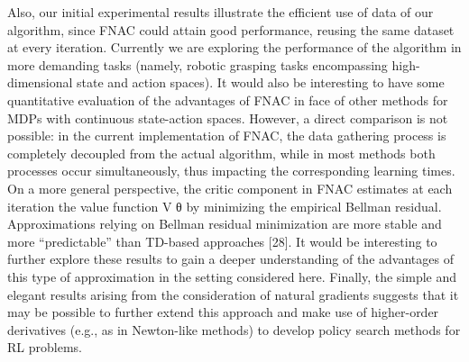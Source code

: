 \begin{itemize}
	Also, our initial experimental results illustrate the eﬃcient use of data of our algorithm, since FNAC could attain good performance, reusing the same dataset at every iteration. Currently we are exploring the performance of the algorithm in more demanding tasks (namely, robotic grasping tasks encompassing high-dimensional state and action spaces). It would also be interesting to have some quantitative evaluation of the advantages of FNAC in face of other methods for MDPs with continuous state-action spaces. However, a direct comparison is not possible: in the current implementation of FNAC, the data gathering process is completely decoupled from the actual algorithm, while in most methods both processes occur simultaneously, thus impacting the corresponding learning times. On a more general perspective, the critic component in FNAC estimates at each iteration the value function V θ by minimizing the empirical Bellman residual. Approximations relying on Bellman residual minimization are more stable and more “predictable” than TD-based approaches [28]. It would be interesting to further explore these results to gain a deeper understanding of the advantages of this type of approximation in the setting considered here. Finally, the simple and elegant results arising from the consideration of natural gradients suggests that it may be possible to further extend this approach and make use of higher-order derivatives (e.g., as in Newton-like methods) to develop policy search methods for RL problems.
\end{itemize}
\fi




\newpage



